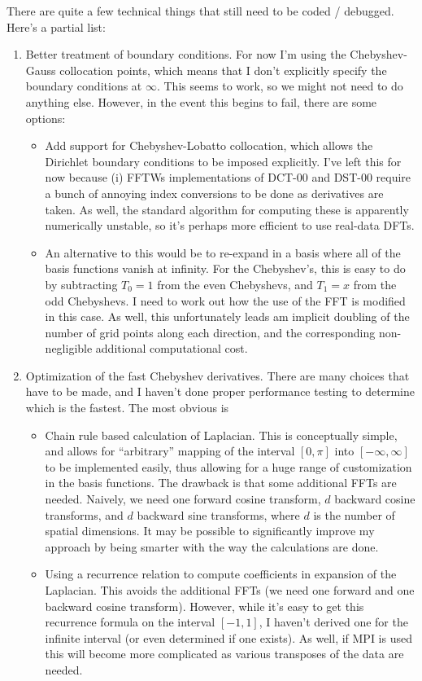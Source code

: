 \documentclass{revtex4}
\begin{document}
There are quite a few technical things that still need to be coded / debugged.  Here's a partial list:
\begin{enumerate}
\item Better treatment of boundary conditions.  For now I'm using the Chebyshev-Gauss collocation points, which means that I don't explicitly specify the boundary conditions at $\infty$.  This seems to work, so we might not need to do anything else.  However, in the event this begins to fail, there are some options:
  \begin{itemize}
  \item Add support for Chebyshev-Lobatto collocation, which allows the Dirichlet boundary conditions to be imposed explicitly.  I've left this for now because (i) FFTWs implementations of DCT-00 and DST-00 require a bunch of annoying index conversions to be done as derivatives are taken.  As well, the standard algorithm for computing these is apparently numerically unstable, so it's perhaps more efficient to use real-data DFTs.
  \item An alternative to this would be to re-expand in a basis where all of the basis functions vanish at infinity.  For the Chebyshev's, this is easy to do by subtracting $T_0 = 1$ from the even Chebyshevs, and $T_1 = x$ from the odd Chebyshevs.  I need to work out how the use of the FFT is modified in this case.  As well, this unfortunately leads am implicit doubling of the number of grid points along each direction, and the corresponding non-negligible additional computational cost.
  \end{itemize}
\item Optimization of the fast Chebyshev derivatives.  There are many choices that have to be made, and I haven't done proper performance testing to determine which is the fastest.  The most obvious is
  \begin{itemize}
  \item Chain rule based calculation of Laplacian.  This is conceptually simple, and allows for ``arbitrary'' mapping of the interval $[0,\pi]$ into $[-\infty,\infty]$ to be implemented easily, thus allowing for a huge range of customization in the basis functions.  The drawback is that some additional FFTs are needed. Naively, we need one forward cosine transform, $d$ backward cosine transforms, and $d$ backward sine transforms, where $d$ is the number of spatial dimensions.  It may be possible to significantly improve my approach by being smarter with the way the calculations are done.
  \item Using a recurrence relation to compute coefficients in expansion of the Laplacian.  This avoids the additional FFTs (we need one forward and one backward cosine transform).  However, while it's easy to get this recurrence formula on the interval $[-1,1]$, I haven't derived one for the infinite interval (or even determined if one exists).  As well, if MPI is used this will become more complicated as various transposes of the data are needed.

\end{itemize}
\end{enumerate}
\end{document}
